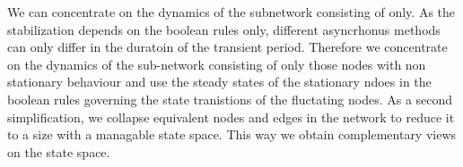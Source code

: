 \documentclass{article}
\begin{document}
We can concentrate on the dynamics of the subnetwork consisting of only. As the stabilization depends on the boolean rules only, different asyncrhonus methods can only differ in the duratoin of the transient period. Therefore we concentrate on the dynamics of the sub-network  consisting of only those nodes with non stationary behaviour and use the steady states of the stationary ndoes in the boolean rules governing the state tranistions of the fluctating nodes. As a second simplification, we collapse equivalent nodes and edges in the network to reduce it to a size with a managable state space. This way we obtain complementary views on the state space. 
\end{document}
